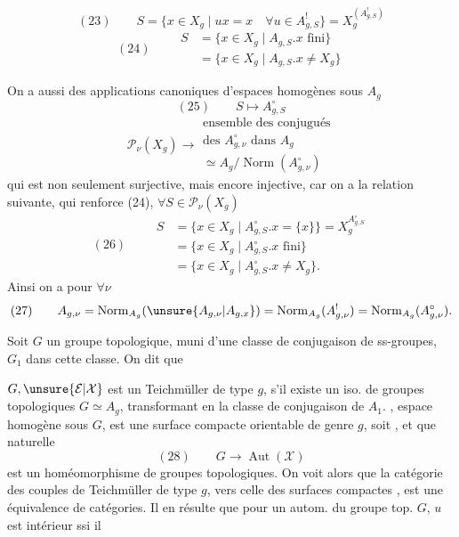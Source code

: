 \[
(23)\qquad S=\{x\in X_g\mid ux=x\quad\forall u\in A_{g,S}^!\}
=X_g^{(A_{g,S}^!)}
\]
\[
(24)\qquad\begin{aligned}
S&=\{x\in X_g\mid A_{g,S}.x\text{ fini}\}\\
 &=\{x\in X_g\mid A_{g,S}.x\ne X_g\}
\end{aligned}
\]

On a aussi des applications canoniques
d'espaces homogènes sous $A_g$
\[
(25)\qquad S\longmapsto A_{g,S}^{\circ}
\]
\[
\mathcal P_\nu(X_g)\longrightarrow
\begin{gathered}
\text{ensemble des conjugués}\\
\text{des }A_{g,\nu}^{\circ}\text{ dans }A_g\\
\simeq A_g/\operatorname{Norm}(A_{g,\nu}^{\circ})
\end{gathered}
\]
qui est non seulement surjective, mais encore
injective, car on a la relation suivante, qui
renforce  (24), $\forall S\in\mathcal P_\nu(X_g)$
\[
(26)\qquad\begin{aligned}
S&=\{x\in X_g\mid A_{g,S}^{\circ}.x=\{x\}\}=X_g^{A_{g,S}^{\circ}}\\
 &=\{x\in X_g\mid A_{g,S}^{\circ}.x\text{ fini}\}\\
 &=\{x\in X_g\mid A_{g,S}^{\circ}.x\ne X_g\}.
\end{aligned}
\]
Ainsi on a  pour $\forall\nu$
\[
(27)\qquad A_{g,\nu}=\operatorname{Norm}_{A_g}(\unsure{A_{g,\nu}|A_{g,x}})
=\operatorname{Norm}_{A_g}(A_{g,\nu}^!)=\operatorname{Norm}_{A_g}(A_{g,\nu}^{\circ}).
\]

Soit $G$ un groupe topologique, muni
d'une classe de conjugaison  de ss-groupes,
 $G_1$ dans cette classe. On dit que

$G,\unsure{\mathcal E|\mathcal X}$ est un   Teichmüller
de type $g$, s'il existe un iso. de groupes
topologiques $G\simeq A_g$, transformant
 en la classe de conjugaison de $A_1$.
 , 
espace homogène
sous $G$, est  une
surface compacte orientable de genre $g$,
 soit , et que
 
naturelle
\[
(28)\qquad G\longrightarrow\operatorname{Aut}(\mathcal X)
\]
est un homéomorphisme de groupes topologiques.
On voit alors que 
la catégorie des
couples de Teichmüller de type $g$, vers
celle des surfaces compactes , est
une équivalence de catégories. Il en résulte
que  pour un autom.  du
groupe top. $G$, $u$ est intérieur ssi il

